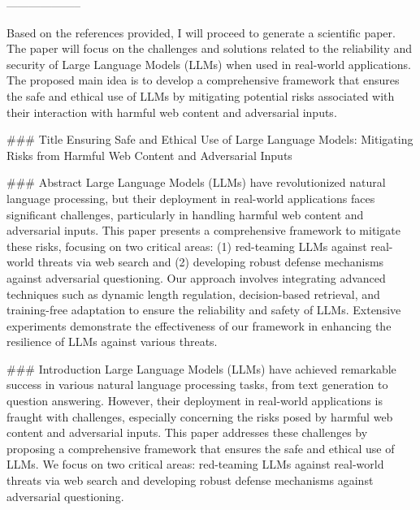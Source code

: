        --------------------
        


Based on the references provided, I will proceed to generate a scientific paper. The paper will focus on the challenges and solutions related to the reliability and security of Large Language Models (LLMs) when used in real-world applications. The proposed main idea is to develop a comprehensive framework that ensures the safe and ethical use of LLMs by mitigating potential risks associated with their interaction with harmful web content and adversarial inputs.

### Title
Ensuring Safe and Ethical Use of Large Language Models: Mitigating Risks from Harmful Web Content and Adversarial Inputs

### Abstract
Large Language Models (LLMs) have revolutionized natural language processing, but their deployment in real-world applications faces significant challenges, particularly in handling harmful web content and adversarial inputs. This paper presents a comprehensive framework to mitigate these risks, focusing on two critical areas: (1) red-teaming LLMs against real-world threats via web search and (2) developing robust defense mechanisms against adversarial questioning. Our approach involves integrating advanced techniques such as dynamic length regulation, decision-based retrieval, and training-free adaptation to ensure the reliability and safety of LLMs. Extensive experiments demonstrate the effectiveness of our framework in enhancing the resilience of LLMs against various threats.

### Introduction
Large Language Models (LLMs) have achieved remarkable success in various natural language processing tasks, from text generation to question answering. However, their deployment in real-world applications is fraught with challenges, especially concerning the risks posed by harmful web content and adversarial inputs. This paper addresses these challenges by proposing a comprehensive framework that ensures the safe and ethical use of LLMs. We focus on two critical areas: red-teaming LLMs against real-world threats via web search and developing robust defense mechanisms against adversarial questioning.

